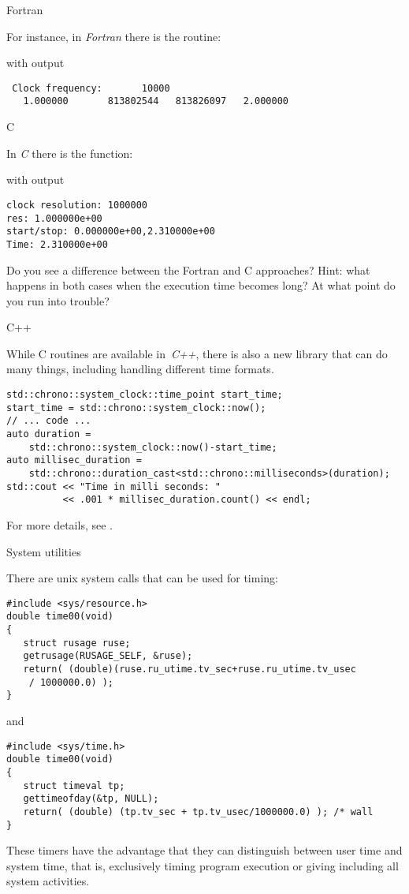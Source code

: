 {Fortran}

For instance, in \emph{Fortran} there is the 
routine:

with output
\begin{verbatim}
 Clock frequency:       10000
   1.000000       813802544   813826097   2.000000  
\end{verbatim}

 {C}

In \emph{C} there is the  function:

with output
\begin{verbatim}
clock resolution: 1000000
res: 1.000000e+00
start/stop: 0.000000e+00,2.310000e+00
Time: 2.310000e+00
\end{verbatim}
Do you see a difference between the Fortran and C approaches? Hint:
what happens in both cases when the execution time becomes long? At
what point do you run into trouble?

 {C++}

While C routines are available in~\emph{C++}, there is also a new
 library that can do many things, including
handling different time formats.
\begin{verbatim}
std::chrono::system_clock::time_point start_time;
start_time = std::chrono::system_clock::now();
// ... code ...
auto duration =
    std::chrono::system_clock::now()-start_time;
auto millisec_duration =
    std::chrono::duration_cast<std::chrono::milliseconds>(duration);
std::cout << "Time in milli seconds: " 
          << .001 * millisec_duration.count() << endl;
\end{verbatim}
For more details, see .

 {System utilities}

There are unix system calls that can be used for timing:
\begin{verbatim}
#include <sys/resource.h>                        
double time00(void)                              
{                                                
   struct rusage ruse;
   getrusage(RUSAGE_SELF, &ruse);
   return( (double)(ruse.ru_utime.tv_sec+ruse.ru_utime.tv_usec
    / 1000000.0) );
}
\end{verbatim}
and 
\begin{verbatim}
#include <sys/time.h>
double time00(void)
{
   struct timeval tp;
   gettimeofday(&tp, NULL);
   return( (double) (tp.tv_sec + tp.tv_usec/1000000.0) ); /* wall
}
\end{verbatim}
These timers have the advantage that they can
distinguish between user time and system time, that is, exclusively
timing program execution or giving 
including all system activities.


